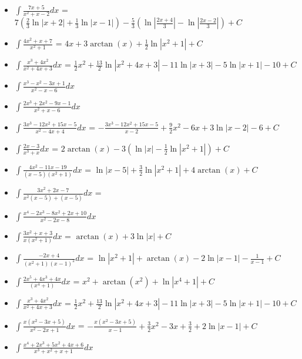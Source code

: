\begin{itemize}
\tightlist
\item
  \(\displaystyle\int \frac{7x + 5}{x^2 + x - 2} dx\) =
  \(7\left(\frac{2}{3}\ln \left|x+2\right|+\frac{1}{3}\ln \left|x-1\right|\right)-\frac{5}{3}\left(\ln \left|\frac{2x+4}{3}\right|-\ln \left|\frac{2x-2}{3}\right|\right)+C\)
\item
  \(\displaystyle \int \frac{4x^2 + x + 7}{x^2 + 1}\) =
  \(4x+3\arctan \left(x\right)+\frac{1}{2}\ln \left|x^2+1\right|+C\)
\item
  \(\displaystyle \int \frac{x^3 + 4x^2}{x^2 + 4x + 3}dx\) =
  \(\frac{1}{2}x^2+\frac{13}{2}\ln \left|x^2+4x+3\right|-11\ln \left|x+3\right|-5\ln \left|x+1\right|-10+C\)
\item
  \(\displaystyle \int \frac{x^3 - x^2 - 3x + 1}{x^2 - x - 6}dx\)
\item
  \(\displaystyle \int \frac{2x^3 + 2x^2 - 9x - 1}{x^2 + x - 6}dx\)
\item
  \(\displaystyle \int \frac{3x^3 - 12x^2 + 15x -5}{x^2 - 4x + 4}dx\) =
  \(-\frac{3x^3-12x^2+15x-5}{x-2}+\frac{9}{2}x^2-6x+3\ln \left|x-2\right|-6+C\)
\item
  \(\displaystyle \int \frac{2x-3}{x^3 + x}dx\) =
  \(2\arctan \left(x\right)-3\left(\ln \left|x\right|-\frac{1}{2}\ln \left|x^2+1\right|\right)+C\)
\item
  \(\displaystyle \int \frac{4x^2 - 11x - 19}{(x-5)(x^2 + 1)}dx\) =
  \(\ln \left|x-5\right|+\frac{3}{2}\ln \left|x^2+1\right|+4\arctan \left(x\right)+C\)
\item
  \(\displaystyle \int \frac{3x^2 + 2x - 7}{x^2(x-5) + (x-5)}dx\) =
\item
  \(\displaystyle \int \frac{x^4 - 2x^3 - 8x^2 + 2x + 10 }{x^2 - 2x - 8}dx\)
\item
  \(\displaystyle \int \frac{3x^2 + x + 3}{x(x^2+1)}dx\) =
  \(\arctan \left(x\right)+3\ln \left|x\right|+C\)
\item
  \(\displaystyle \int \frac{-2x+4}{(x^2+1)(x-1)^2}dx\) =
  \(\ln \left|x^2+1\right|+\arctan \left(x\right)-2\ln \left|x-1\right|-\frac{1}{x-1}+C\)
\item
  \(\displaystyle \int \frac{2x^5 + 4x^3 + 4x}{(x^4+1)}dx\) =
  \(x^2+\arctan \left(x^2\right)+\ln \left|x^4+1\right|+C\)
\item
  \(\displaystyle \int \frac{x^3 + 4x^2}{x^2 + 4x + 3}dx\) =
  \(\frac{1}{2}x^2+\frac{13}{2}\ln \left|x^2+4x+3\right|-11\ln \left|x+3\right|-5\ln \left|x+1\right|-10+C\)
\item
  \(\displaystyle \int \frac{x(x^2 - 3x + 5)}{x^2 - 2x + 1}dx\) =
  \(-\frac{x\left(x^2-3x+5\right)}{x-1}+\frac{3}{2}x^2-3x+\frac{3}{2}+2\ln \left|x-1\right|+C\)
\item
  \(\displaystyle \int \frac{x^4 + 2x^3 + 5x^2 + 4x + 6}{x^3 + x^2 + x + 1}dx\)
\end{itemize}
